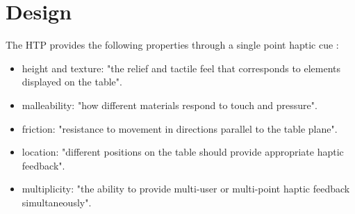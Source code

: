 \chapter{Design}

 The HTP provides the following properties through a single point haptic cue  :
\begin{itemize}
	\item height and texture: "the relief and tactile feel that corresponds to elements displayed on the table".
    \item malleability: "how different materials respond to touch and pressure".
    \item friction: "resistance to movement in directions parallel to the table plane".
    \item location: "different positions on the table should provide appropriate haptic feedback".
    \item multiplicity: "the ability to provide multi-user or multi-point haptic feedback simultaneously". \cite{marquardt2009haptic}
\end{itemize}


